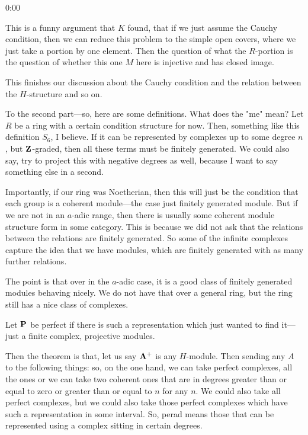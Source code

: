 \begin{unfinished}{0:00}
{\begin{theorem}
%
This is a funny argument that $K$ found, that if we just assume the Cauchy condition, then we can reduce this problem to the simple open covers, where we just take a portion by one element. Then the question of what the $R$-portion is the question of whether this one $M$ here is injective and has closed image.

%
This finishes our discussion about the Cauchy condition and the relation between the $H$-structure and so on.

%
To the second part---so, here are some definitions. What does the "me" mean? Let $R$ be a ring with a certain condition structure for now. Then, something like this definition $S_6$, I believe.  If it can be represented by complexes up to some degree $n$, but $\Z$-graded, then all these terms must be finitely generated. We could also say, try to project this with negative degrees as well, because I want to say something else in a second.

%
Importantly, if our ring was Noetherian, then this will just be the condition that each group is a coherent module---the case just finitely generated module. But if we are not in an $a$-adic range, then there is usually some coherent module structure form in some category. This is because we did not ask that the relations between the relations are finitely generated. So some of the infinite complexes capture the idea that we have modules, which are finitely generated with as many further relations.

%
The point is that over in the $a$-adic case, it is a good class of finitely generated modules behaving nicely. We do not have that over a general ring, but the ring still has a nice class of complexes.
 
Let $\P$ be perfect if there is such a representation which just wanted to find it---just a finite complex, projective modules.

%
Then the theorem is that, let us say $\A^+$ is any $H$-module. Then sending any $A$ to the following things: so, on the one hand, we can take perfect complexes, all the ones or we can take two coherent ones that are in degrees greater than or equal to zero or greater than or equal to $n$ for any $n$.  We could also take all perfect complexes, but we could also take those perfect complexes which have such a representation in some interval. So, perad means those that can be represented using a complex sitting in certain degrees.



\end{theorem}}
\end{unfinished}
